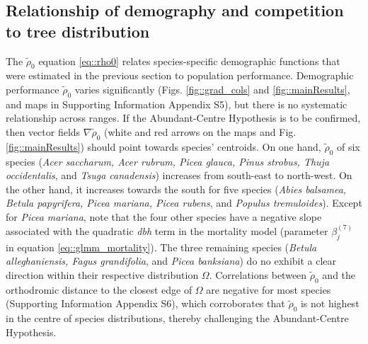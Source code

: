 \subsection{Relationship of demography and competition to tree distribution} %
The $ \tilde \rho_0 $ equation \eqref{eq::rho0} relates species-specific demographic functions that were estimated in the previous section to population performance. Demographic performance $ \tilde \rho_0 $ varies significantly (Figs. \ref{fig::grad_cols} and \ref{fig::mainResults}, and maps in Supporting Information Appendix S5), but there is no systematic relationship across ranges. If the Abundant-Centre Hypothesis is to be confirmed, then vector fields $ \nabla \tilde \rho_0 $ (white and red arrows on the maps and Fig. \ref{fig::mainResults}) should point towards species' centroids. On one hand, $ \tilde \rho_0 $ of six species (\textit{Acer saccharum, Acer rubrum, Picea glauca, Pinus strobus, Thuja occidentalis}, and \textit{Tsuga canadensis}) increases from south-east to north-west. On the other hand, it increases towards the south for five species (\textit{Abies balsamea, Betula papyrifera, Picea mariana, Picea rubens}, and \textit{Populus tremuloides}). Except for \textit{Picea mariana}, note that the four other species have a negative slope associated with the quadratic \textit{dbh} term in the mortality model (parameter $ \beta_j^{(7)} $ in equation \eqref{eq::glmm_mortality}). The three remaining species (\textit{Betula alleghaniensis, Fagus grandifolia}, and \textit{Picea banksiana}) do no exhibit a clear direction within their respective distribution $ \Omega $. Correlations between $ \tilde \rho_0 $ and the orthodromic distance to the closest edge of $ \Omega $ are negative for most species (Supporting Information Appendix S6), which corroborates that $ \tilde \rho_0 $ is not highest in the centre of species distributions, thereby challenging the Abundant-Centre Hypothesis.

